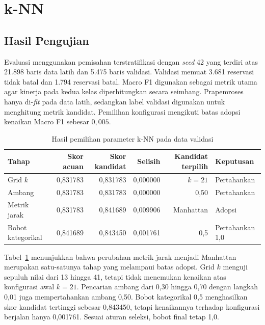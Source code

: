\section{k-NN}
\subsection{Hasil Pengujian}

Evaluasi menggunakan pemisahan terstratifikasi dengan \textit{seed} 42 yang terdiri atas 21.898 baris data latih dan 5.475 baris validasi. Validasi memuat 3.681 reservasi tidak batal dan 1.794 reservasi batal. Macro F1 digunakan sebagai metrik utama agar kinerja pada kedua kelas diperhitungkan secara seimbang. Prapemroses hanya di-\textit{fit} pada data latih, sedangkan label validasi digunakan untuk menghitung metrik kandidat. Pemilihan konfigurasi mengikuti batas adopsi kenaikan Macro F1 sebesar $0{,}005$.

\begin{table}[H]
    \centering
    \caption{Hasil pemilihan parameter k-NN pada data validasi}
    \label{tab-knn-selection}
    \begin{tabular}{lrrrrl}
        \hline
        Tahap             & Skor acuan & Skor kandidat & Selisih  & Kandidat terpilih & Keputusan       \\
        \hline
        Grid $k$          & 0,831783   & 0,831783      & 0,000000 & $k=21$            & Pertahankan     \\
        Ambang            & 0,831783   & 0,831783      & 0,000000 & 0,50              & Pertahankan     \\
        Metrik jarak      & 0,831783   & 0,841689      & 0,009906 & Manhattan         & Adopsi          \\
        Bobot kategorikal & 0,841689   & 0,843450      & 0,001761 & 0,5               & Pertahankan 1,0 \\
        \hline
    \end{tabular}
\end{table}

Tabel~\ref{tab-knn-selection} menunjukkan bahwa perubahan metrik jarak menjadi Manhattan merupakan satu-satunya tahap yang melampaui batas adopsi. Grid $k$ menguji sepuluh nilai dari 13 hingga 41, tetapi tidak menemukan kenaikan atas konfigurasi awal $k=21$. Pencarian ambang dari 0,30 hingga 0,70 dengan langkah 0,01 juga mempertahankan ambang 0,50. Bobot kategorikal 0,5 menghasilkan skor kandidat tertinggi sebesar 0,843450, tetapi kenaikannya terhadap konfigurasi berjalan hanya 0,001761. Sesuai aturan seleksi, bobot final tetap 1,0.

